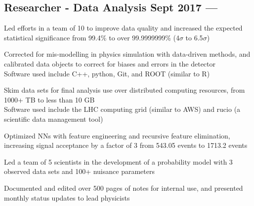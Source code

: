 \documentclass[letter,10pt]{article}
\begin{document}
\subsection{{Researcher - Data Analysis  \hfill Sept 2017 --- }}
\begin{zitemize}
\item Led efforts in a team of 10 to improve data quality and increased the expected statistical significance from 99.4\% to over 99.9999999\% (4$\sigma$ to 6.5$\sigma$)
\item Corrected for mis-modelling in physics simulation with data-driven methods, and calibrated data objects to correct for biases and errors in the detector \\
Software used include C++, python, Git, and ROOT (similar to R)
\item Skim data sets for final analysis use over distributed computing resources, from  1000+ TB to less than 10 GB \\
Software used include the LHC computing grid (similar to AWS) and rucio (a scientific data management tool)
\item Optimized NNs with feature engineering and recursive feature elimination, increasing signal acceptance by a factor of 3 from 543.05 events to 1713.2 events
\item Led a team of 5 scientists in the development of a probability model with 3 observed data sets and 100+ nuisance parameters
\item Documented and edited over 500 pages of notes for internal use, and presented monthly status updates to lead physicists
\end{zitemize}
\end{document}
